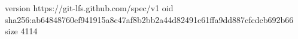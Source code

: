 version https://git-lfs.github.com/spec/v1
oid sha256:ab64848760ef941915a8c47af8b2bb2a44d82491c61ffa9dd887cfcdcb692b66
size 4114
